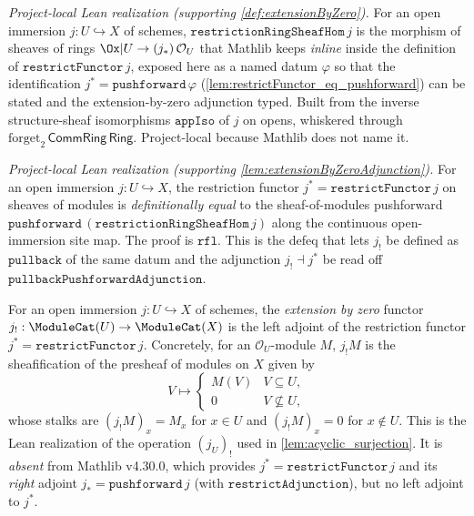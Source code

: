 \begin{definition}
  \label{def:restrictionRingSheafHom}
  \textit{Project-local Lean realization (supporting \cref{def:extensionByZero}).}
  For an open immersion $j : U \hookrightarrow X$ of schemes,
  $\mathtt{restrictionRingSheafHom}\,j$ is the morphism of sheaves of rings
  $\Ox|U \to (j_*)\,\mathcal{O}_U$ that Mathlib keeps \emph{inline} inside the
  definition of $\mathtt{restrictFunctor}\,j$, exposed here as a named datum
  $\varphi$ so that the identification $j^{*} = \mathtt{pushforward}\,\varphi$
  (\cref{lem:restrictFunctor_eq_pushforward}) can be stated and the
  extension-by-zero adjunction typed. Built from the inverse structure-sheaf
  isomorphisms $\mathtt{appIso}$ of $j$ on opens, whiskered through
  $\mathrm{forget}_2\,\mathsf{CommRing}\,\mathsf{Ring}$. Project-local because
  Mathlib does not name it.
\end{definition}

\begin{lemma}
  \label{lem:restrictFunctor_eq_pushforward}
  \textit{Project-local Lean realization (supporting \cref{lem:extensionByZeroAdjunction}).}
  For an open immersion $j : U \hookrightarrow X$, the restriction functor
  $j^{*} = \mathtt{restrictFunctor}\,j$ on sheaves of modules is
  \emph{definitionally equal} to the sheaf-of-modules pushforward
  $\mathtt{pushforward}\,(\mathtt{restrictionRingSheafHom}\,j)$ along the
  continuous open-immersion site map. The proof is $\mathtt{rfl}$. This is the
  defeq that lets $j_!$ be defined as $\mathtt{pullback}$ of the same datum and
  the adjunction $j_! \dashv j^{*}$ be read off
  $\mathtt{pullbackPushforwardAdjunction}$.
\end{lemma}

\begin{definition}
  \label{def:extensionByZero}
  For an open immersion $j : U \hookrightarrow X$ of schemes, the
  \emph{extension by zero} functor
  $j_! : \ModuleCat(U) \to \ModuleCat(X)$ is the left adjoint of the restriction
  functor $j^{*} = \mathtt{restrictFunctor}\,j$. Concretely, for an
  $\mathcal{O}_U$-module $M$, $j_! M$ is the sheafification of the presheaf of
  modules on $X$ given by
  \[
    V \longmapsto
      \begin{cases} M(V) & V \subseteq U,\\[2pt] 0 & V \not\subseteq U,\end{cases}
  \]
  whose stalks are $(j_! M)_x = M_x$ for $x \in U$ and $(j_! M)_x = 0$ for
  $x \notin U$. This is the Lean realization of the operation $(j_U)_!$ used in
  \cref{lem:acyclic_surjection}. It is \emph{absent} from Mathlib v4.30.0, which
  provides $j^{*} = \mathtt{restrictFunctor}\,j$ and its \emph{right} adjoint
  $j_{*} = \mathtt{pushforward}\,j$ (with $\mathtt{restrictAdjunction}$), but no
  left adjoint to $j^{*}$.
\end{definition}

